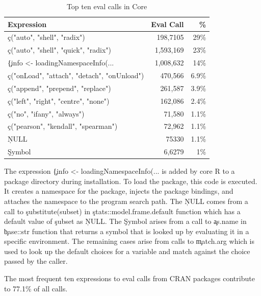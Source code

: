 \documentclass[conference]{IEEEtran}
\begin{document}
\begin{table}[!h] \centering
\begin{tabular}{@{}l|rr@{}} \hline
Expression & Eval Call &  \% \\\hline
\c{c("auto", "shell", "radix")} & 198,7105 & 29\%\\
\c{c("auto", "shell", "quick", "radix")} & 1,593,169  & 23\%\\
\c{\{info <- loadingNamespaceInfo(...} & 1,008,632 &       14\%\\
\c{c("onLoad", "attach", "detach", "onUnload")}   & 470,566 &      6.9\%\\
\c{c("append", "prepend", "replace")} &              261,587&       3.9\% \\
\c{c("left", "right", "centre", "none")} & 162,086     & 2.4\%\\
\c{c("no", "ifany", "always")}   &                71,580 &       1.1\%\\
\c{c("pearson", "kendall", "spearman")}  & 72,962 &      1.1\%\\
\c{NULL}& 75330  &      1.1\% \\
\c{Symbol}&                 6,6279&       1\%\\\hline
\end{tabular}
\caption{Top ten eval calls in Core}\label{B}
\end{table}

The expression \c{\{info <- loadingNamespaceInfo(...} is added by core R
to a package directory during installation. To load the package, this code is
executed. It creates a namespace for the package, injects the package bindings,
and attaches the namespace to the program search path. The \c{NULL} comes from a
call to \c{substitute(subset)} in \c{stats::model.frame.default} function which
has a default value of \c{subset} as \c{NULL}. The \c{Symbol} arises from a
call to \c{as.name} in \c{base::str} function that returns a symbol that is
looked up by evaluating it in a specific environment. The remaining cases arise
from calls to \c{match.arg} which is used to look up the default choices for a
variable and match against the choice passed by the caller.

The most frequent ten expressions to eval calls from CRAN packages
contribute to 77.1\% of all \eval calls.
\end{document}
